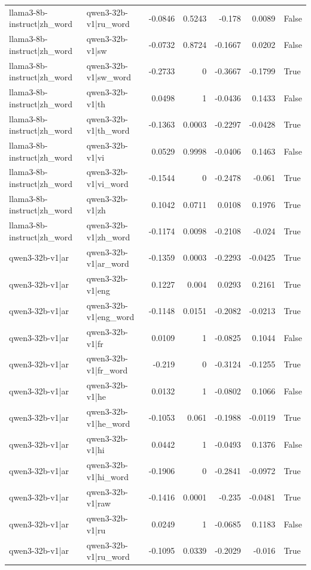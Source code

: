 \begin{table}
\begin{tabular}{l l r r r r l}
llama3-8b-instruct|zh_word & qwen3-32b-v1|ru_word & -0.0846 & 0.5243 & -0.178 & 0.0089 & False \\
llama3-8b-instruct|zh_word & qwen3-32b-v1|sw & -0.0732 & 0.8724 & -0.1667 & 0.0202 & False \\
llama3-8b-instruct|zh_word & qwen3-32b-v1|sw_word & -0.2733 & 0 & -0.3667 & -0.1799 & True \\
llama3-8b-instruct|zh_word & qwen3-32b-v1|th & 0.0498 & 1 & -0.0436 & 0.1433 & False \\
llama3-8b-instruct|zh_word & qwen3-32b-v1|th_word & -0.1363 & 0.0003 & -0.2297 & -0.0428 & True \\
llama3-8b-instruct|zh_word & qwen3-32b-v1|vi & 0.0529 & 0.9998 & -0.0406 & 0.1463 & False \\
llama3-8b-instruct|zh_word & qwen3-32b-v1|vi_word & -0.1544 & 0 & -0.2478 & -0.061 & True \\
llama3-8b-instruct|zh_word & qwen3-32b-v1|zh & 0.1042 & 0.0711 & 0.0108 & 0.1976 & True \\
llama3-8b-instruct|zh_word & qwen3-32b-v1|zh_word & -0.1174 & 0.0098 & -0.2108 & -0.024 & True \\
qwen3-32b-v1|ar & qwen3-32b-v1|ar_word & -0.1359 & 0.0003 & -0.2293 & -0.0425 & True \\
qwen3-32b-v1|ar & qwen3-32b-v1|eng & 0.1227 & 0.004 & 0.0293 & 0.2161 & True \\
qwen3-32b-v1|ar & qwen3-32b-v1|eng_word & -0.1148 & 0.0151 & -0.2082 & -0.0213 & True \\
qwen3-32b-v1|ar & qwen3-32b-v1|fr & 0.0109 & 1 & -0.0825 & 0.1044 & False \\
qwen3-32b-v1|ar & qwen3-32b-v1|fr_word & -0.219 & 0 & -0.3124 & -0.1255 & True \\
qwen3-32b-v1|ar & qwen3-32b-v1|he & 0.0132 & 1 & -0.0802 & 0.1066 & False \\
qwen3-32b-v1|ar & qwen3-32b-v1|he_word & -0.1053 & 0.061 & -0.1988 & -0.0119 & True \\
qwen3-32b-v1|ar & qwen3-32b-v1|hi & 0.0442 & 1 & -0.0493 & 0.1376 & False \\
qwen3-32b-v1|ar & qwen3-32b-v1|hi_word & -0.1906 & 0 & -0.2841 & -0.0972 & True \\
qwen3-32b-v1|ar & qwen3-32b-v1|raw & -0.1416 & 0.0001 & -0.235 & -0.0481 & True \\
qwen3-32b-v1|ar & qwen3-32b-v1|ru & 0.0249 & 1 & -0.0685 & 0.1183 & False \\
qwen3-32b-v1|ar & qwen3-32b-v1|ru_word & -0.1095 & 0.0339 & -0.2029 & -0.016 & True \\

\end{tabular}
\end{table}
